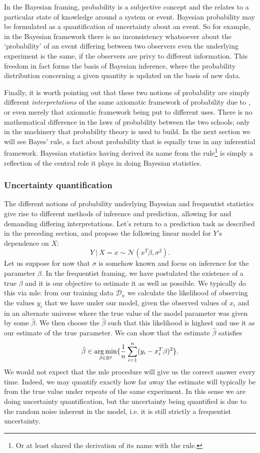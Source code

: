 \documentclass[thesis.tex]{subfiles}
\begin{document}
In the Bayesian framing, probability is a subjective concept and the relates to a particular state of knowledge around a system or event. Bayesian probability may be formulated as a quantification of uncertainty about an event. So for example, in the Bayesian framework there is no inconsistency whatsoever about the `probability' of an event differing between two observers even the underlying experiment is the same, if the observers are privy to different information. This freedom in fact forms the basis of Bayesian inference, where the probability distribution concerning a given quantity is updated on the basis of new data.

Finally, it is worth pointing out that these two notions of probability are simply different \emph{interpretations} of the same axiomatic framework of probability due to \citet{kolmogoroff_grundbegriffe_1933}, or even merely that axiomatic framework being put to different uses. There is no mathematical difference in the laws of probability between the two schools; only in the machinery that probability theory is used to build. In the next section we will see Bayes' rule, a fact about probability that is equally true in any inferential framework. Bayesian statistics having derived its name from the rule\footnote{Or at least shared the derivation of its name with the rule.} is simply a reflection of the central role it plays in doing Bayesian statistics.

\subsubsection{Uncertainty quantification}
The different notions of probability underlying Bayesian and frequentist statistics give rise to different methods of inference and prediction, allowing for and demanding differing interpretations. Let's return to a prediction task as described in the preceding section, and propose the following linear model for $Y$'s dependence on $X$: 
\[Y \ | \ X=x \sim \mathcal{N}(x^T\beta, \sigma^2). \]
Let us suppose for now that $\sigma$ is somehow known and focus on inference for the parameter $\beta$. In the frequentist framing, we have postulated the existence of a true $\beta$ and it is our objective to estimate it as well as possible. We typically do this via \gls{mle}: from our training data $\mathcal{D}_n$ we calculate the likelihood of observing the values $y_i$ that we have under our model, given the observed values of $x_i$ and in an alternate universe where the true value of the model parameter was given by some $\hat{\beta}$. We then choose the $\hat{\beta}$ such that this likelihood is highest and use it as our estimate of the true parameter. We can show that the estimate $\hat{\beta}$ satisfies
\[\hat{\beta} \in \operatorname*{arg\,min}_{\beta \in \mathbb{R}^p} \{{\frac{1}{n}\sum_{i=1}^n (y_i - x_i^T\beta)^2} \}.\]
We would not expect that the \gls{mle} procedure will give us the correct answer every time. Indeed, we may quantify exactly how far away the estimate will typically be from the true value under repeats of the same experiment. In this sense we are doing uncertainty quantification, but the uncertainty being quantified is due to the random noise inherent in the model, i.e. it is still strictly a frequentist uncertainty.
\end{document}
